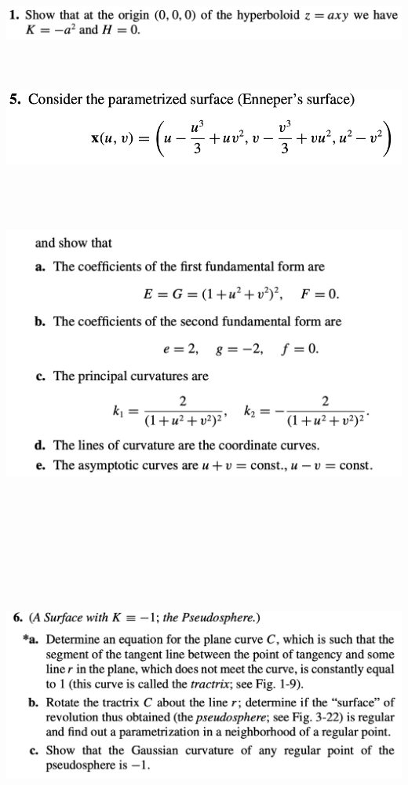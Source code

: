 \documentclass{report}
\begin{document}
\begin{question}{}{}
\includegraphics[height=3cm,width=18cm]{hw5q7}
\end{question}
\begin{question}{}{}
\includegraphics[height=3cm,width=18cm]{hw5q8}
\includegraphics[height=12cm,width=18cm]{hw5q8a}
\end{question}
\begin{question}{}{}
\includegraphics[height=10cm,width=18cm]{hw5q9}
\end{question}
\end{document}

